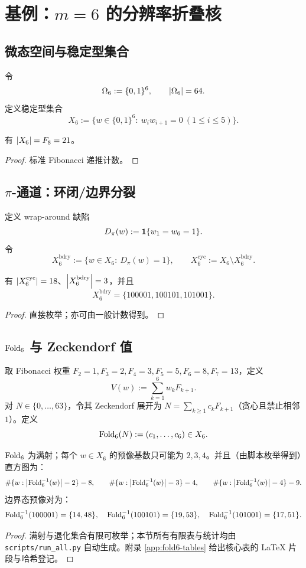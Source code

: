 \section{基例：$m=6$ 的分辨率折叠核}\label{sec:fold6}

\subsection{微态空间与稳定型集合}
令
\[
  \Omega_6:=\{0,1\}^6,\qquad \left\lvert \Omega_6\right\rvert=64.
\]
定义稳定型集合
\[
  X_6:=\{w\in\{0,1\}^6:\ w_iw_{i+1}=0\ (1\le i\le 5)\}.
\]

\begin{theorem}[$64\to 21$]\label{thm:64to21}
有 $\left\lvert X_6\right\rvert=F_8=21$。
\end{theorem}
\begin{proof}
标准 Fibonacci 递推计数。
\end{proof}

\subsection{$\pi$-通道：环闭/边界分裂}
定义 wrap-around 缺陷
\[
  D_\pi(w):=\mathbf{1}\{w_1=w_6=1\}.
\]
令
\[
  X^{\mathrm{bdry}}_6:=\{w\in X_6:\ D_\pi(w)=1\},\qquad
  X^{\mathrm{cyc}}_6:=X_6\setminus X^{\mathrm{bdry}}_6.
\]

\begin{proposition}[$18\oplus 3$]\label{prop:18plus3}
有 $\left\lvert X^{\mathrm{cyc}}_6\right\rvert=18$、$\left\lvert X^{\mathrm{bdry}}_6\right\rvert=3$，并且
\[
  X^{\mathrm{bdry}}_6=\{100001,100101,101001\}.
\]
\end{proposition}
\begin{proof}
直接枚举；亦可由一般计数得到。
\end{proof}

\subsection{$\mathrm{Fold}_6$ 与 Zeckendorf 值}
取 Fibonacci 权重 $F_2=1,F_3=2,F_4=3,F_5=5,F_6=8,F_7=13$，定义
\[
  V(w):=\sum_{k=1}^6 w_kF_{k+1}.
\]
对 $N\in\{0,\dots,63\}$，令其 Zeckendorf 展开为 $N=\sum_{k\ge 1} c_kF_{k+1}$（贪心且禁止相邻 $1$）。定义
\[
  \mathrm{Fold}_6(N):=(c_1,\dots,c_6)\in X_6.
\]

\begin{theorem}\label{thm:fold6-degeneracy}
$\mathrm{Fold}_6$ 为满射；每个 $w\in X_6$ 的预像基数只可能为 $2,3,4$。并且（由脚本枚举得到）直方图为：
\[
  \#\{w:\left\lvert \mathrm{Fold}_6^{-1}(w)\right\rvert=2\}=8,\qquad
  \#\{w:\left\lvert \mathrm{Fold}_6^{-1}(w)\right\rvert=3\}=4,\qquad
  \#\{w:\left\lvert \mathrm{Fold}_6^{-1}(w)\right\rvert=4\}=9.
\]
边界态预像对为：
\[
  \mathrm{Fold}_6^{-1}(100001)=\{14,48\},\quad
  \mathrm{Fold}_6^{-1}(100101)=\{19,53\},\quad
  \mathrm{Fold}_6^{-1}(101001)=\{17,51\}.
\]
\end{theorem}
\begin{proof}
满射与退化集合有限可枚举；本节所有有限表与统计均由 \texttt{scripts/run\_all.py} 自动生成。附录 \ref{app:fold6-tables} 给出核心表的 \LaTeX{} 片段与哈希登记。
\end{proof}

